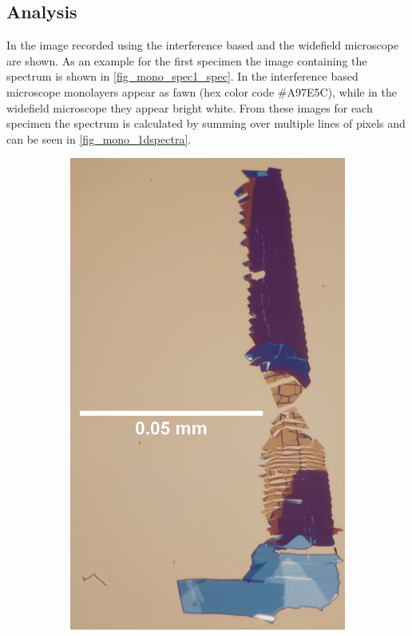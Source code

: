 \subsection{Analysis}

In  the image recorded using the interference based and the widefield microscope are shown.
As an example for the first specimen the image containing the spectrum is shown in \cref{fig_mono_spec1_spec}.
In the interference based microscope monolayers appear as fawn (hex color code \#A97E5C), while in the widefield microscope they appear bright white.
From these images for each specimen the spectrum is calculated by summing over multiple lines of pixels and can be seen in \cref{fig_mono_1dspectra}.

\begin{figure}[H]
    \centering
    \begin{subfigure}{0.3\textwidth}
        \centering
        \includegraphics[width=1.0\textwidth]{img/output_t1/M1_3_100_adj}

\end{subfigure}
\end{figure}
